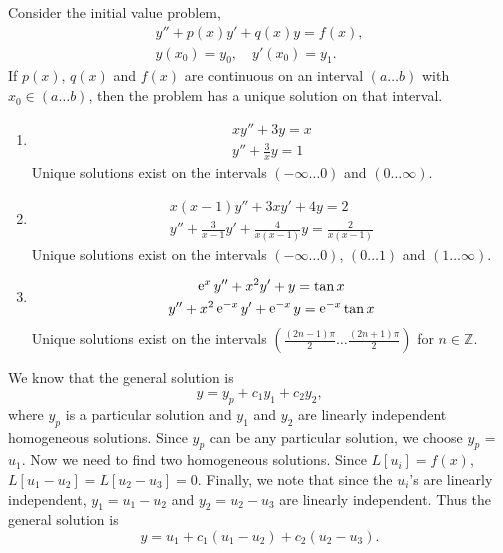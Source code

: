\begin{Solution}
  \label{solution xy3y=x}
  Consider the initial value problem,
  \begin{gather*}
    y'' + p(x) y' + q(x) y = f(x), \\
    y(x_0) = y_0, \quad y'(x_0) = y_1.
  \end{gather*}
  If $p(x)$, $q(x)$ and $f(x)$ are continuous on an interval $(a \ldots b)$ with
  $x_0 \in (a \ldots b)$, then the problem has a unique solution on that interval.

  \begin{enumerate}
  \item
    \begin{gather*}
      x y'' + 3 y = x \\
      y'' + \frac{3}{x} y = 1
    \end{gather*}
    Unique solutions exist on the intervals $(-\infty \ldots 0)$ and 
    $(0 \ldots \infty)$.
  \item
    \begin{gather*}
      x (x-1) y'' + 3 x y' + 4 y = 2 \\
      y'' + \frac{3}{x-1} y' + \frac{4}{x(x-1)} y = \frac{2}{x(x-1)}
    \end{gather*}
    Unique solutions exist on the intervals $(-\infty \ldots 0)$, $(0 \ldots 1)$ and 
    $(1 \ldots \infty)$.
  \item
    \begin{gather*}
      \mathop{\mathrm{e}}\nolimits^x y'' + x^2 y' + y = \tan x \\
      y'' + x^2 \mathop{\mathrm{e}}\nolimits^{-x} y' + \mathop{\mathrm{e}}\nolimits^{-x} y = \mathop{\mathrm{e}}\nolimits^{-x} \tan x
    \end{gather*}
    Unique solutions exist on the intervals 
    $\left( \frac{(2n-1) \pi}{2} \ldots \frac{(2n+1)\pi}{2} \right)$ for
    $n \in \mathbb{Z}$.
  \end{enumerate}
\end{Solution}






\begin{Solution}
  \label{solution 3 particular soln}
  We know that the general solution is 
  \[
  y = y_p + c_1 y_1 + c_2 y_2,
  \]
  where $y_p$ is a particular solution and $y_1$ and $y_2$ are linearly 
  independent homogeneous solutions.  Since $y_p$ can be any particular solution,
  we choose $y_p$ = $u_1$.  Now we need to find two homogeneous solutions.
  Since $L[u_i] = f(x)$, $L[u_1 - u_2] = L[u_2-u_3] = 0$.  Finally, we note that 
  since the $u_i$'s are linearly independent, $y_1 = u_1 - u_2$ and 
  $y_2 = u_2 - u_3$ are linearly independent.  Thus the general solution is
  \[ 
  \boxed{ 
    y = u_1 + c_1(u_1-u_2) + c_2(u_2-u_3).
    } 
  \]
\end{Solution}




